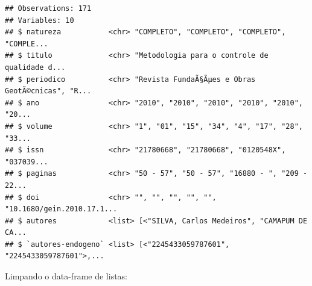 \documentclass[]{article}
\newenvironment{Shaded}{\begin{snugshade}}{\end{snugshade}}
\newcommand{\CharTok}[1]{\textcolor[rgb]{0.31,0.60,0.02}{#1}}
\newcommand{\DataTypeTok}[1]{\textcolor[rgb]{0.13,0.29,0.53}{#1}}
\newcommand{\KeywordTok}[1]{\textcolor[rgb]{0.13,0.29,0.53}{\textbf{#1}}}
\newcommand{\NormalTok}[1]{#1}
\newcommand{\OperatorTok}[1]{\textcolor[rgb]{0.81,0.36,0.00}{\textbf{#1}}}
\newcommand{\StringTok}[1]{\textcolor[rgb]{0.31,0.60,0.02}{#1}}
\begin{document}
\begin{verbatim}
## Observations: 171
## Variables: 10
## $ natureza           <chr> "COMPLETO", "COMPLETO", "COMPLETO", "COMPLE...
## $ titulo             <chr> "Metodologia para o controle de qualidade d...
## $ periodico          <chr> "Revista FundaÃ§Ãµes e Obras GeotÃ©cnicas", "R...
## $ ano                <chr> "2010", "2010", "2010", "2010", "2010", "20...
## $ volume             <chr> "1", "01", "15", "34", "4", "17", "28", "33...
## $ issn               <chr> "21780668", "21780668", "0120548X", "037039...
## $ paginas            <chr> "50 - 57", "50 - 57", "16880 - ", "209 - 22...
## $ doi                <chr> "", "", "", "", "", "10.1680/gein.2010.17.1...
## $ autores            <list> [<"SILVA, Carlos Medeiros", "CAMAPUM DE CA...
## $ `autores-endogeno` <list> [<"2245433059787601", "2245433059787601">,...
\end{verbatim}

Limpando o data-frame de listas:

\begin{Shaded}
\end{Shaded}
\end{document}
